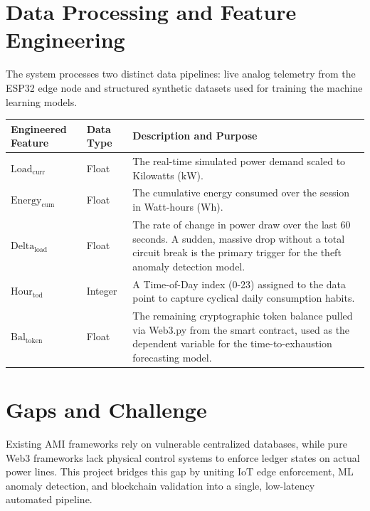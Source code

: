 \section{Data Processing and Feature Engineering}
The system processes two distinct data pipelines: live analog telemetry from the ESP32 edge node and structured synthetic datasets used for training the machine learning models.
\begin{table}[h!]
    \centering
    \renewcommand{\arraystretch}{1.5} %
    \begin{tabular}{|l|l|p{8.5cm}|}
        \hline
        \textbf{Engineered Feature} & \textbf{Data Type} & \textbf{Description and Purpose} \\
        \hline
        $\text{Load}_{\text{curr}}$ & Float & The real-time simulated power demand scaled to Kilowatts ($\text{kW}$). \\
        \hline
        $\text{Energy}_{\text{cum}}$ & Float & The cumulative energy consumed over the session in Watt-hours ($\text{Wh}$). \\
        \hline
        $\text{Delta}_{\text{load}}$ & Float & The rate of change in power draw over the last 60 seconds. A sudden, massive drop without a total circuit break is the primary trigger for the theft anomaly detection model. \\
        \hline
        $\text{Hour}_{\text{tod}}$ & Integer & A Time-of-Day index (0-23) assigned to the data point to capture cyclical daily consumption habits. \\
        \hline
        $\text{Bal}_{\text{token}}$ & Float & The remaining cryptographic token balance pulled via Web3.py from the smart contract, used as the dependent variable for the time-to-exhaustion forecasting model. \\
        \hline
    \end{tabular}
\end{table}

\section{Gaps and Challenge}
Existing AMI frameworks rely on vulnerable centralized databases, while pure Web3 frameworks lack physical control systems to enforce ledger states on actual power lines. This project bridges this gap by uniting IoT edge enforcement, ML anomaly detection, and blockchain validation into a single, low-latency automated pipeline.
